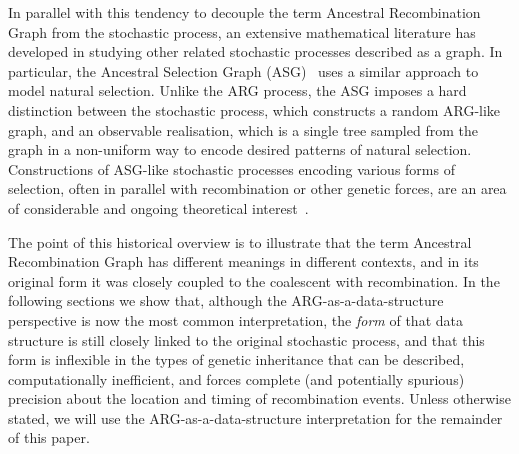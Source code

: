 \documentclass{article}
\begin{document}

In parallel with this tendency to decouple the term
Ancestral Recombination Graph from the stochastic process,
an extensive mathematical literature has developed in
studying other related stochastic processes described as a graph.
In particular, the Ancestral Selection Graph
(ASG)~\citep{krone1997ancestral,neuhauser1997genealogy}
uses a similar approach to model natural selection.
Unlike the ARG process, the ASG imposes a hard distinction between the stochastic process,
which constructs a random ARG-like graph, and an observable realisation,
which is a single tree sampled from the graph in a non-uniform way to encode desired
patterns of natural selection.
Constructions of ASG-like stochastic processes encoding various
forms of selection, often in parallel with recombination or other genetic forces,
are an area of considerable and ongoing theoretical interest~\citep[e.g.][]{
neuhauser1999ancestral,
donnelly1999genealogical,
fearnhead2001perfect,
fearnhead2003ancestral,
etheridge2009coalescent,
gonzalezcasanova2018duality,
koskela2019robust}.

The point of this historical overview is to illustrate that the term
Ancestral Recombination Graph has different meanings in different
contexts, and in its original form it was closely coupled to
the coalescent with recombination. In the following sections we
show that, although the ARG-as-a-data-structure perspective is
now the most common interpretation, the \emph{form} of that
data structure is still closely linked to the original
stochastic process, and that this form is inflexible
in the types of genetic inheritance that can be described,
computationally inefficient, and
forces complete (and potentially spurious) precision about
the location and timing
of recombination events. %
Unless otherwise stated, we will use the ARG-as-a-data-structure
interpretation for the remainder of this paper.
\end{document}
